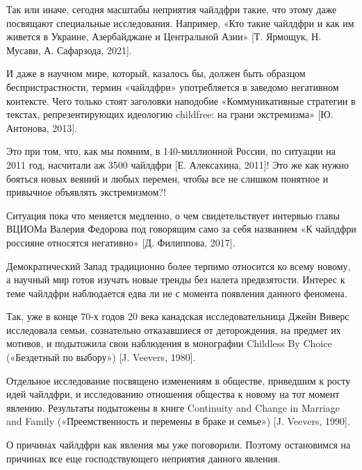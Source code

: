 Так или иначе, сегодня масштабы неприятия чайлдфри такие, что этому даже посвящают специальные исследования. Например, «Кто такие чайлдфри и как им живется в Украине, Азербайджане и Центральной Азии» [Т. Ярмощук, Н. Мусави, А. Сафарзода, 2021].

И даже в научном мире, который, казалось бы, должен быть образцом беспристрастности, термин «чайлдфри» употребляется в заведомо негативном контексте. Чего только стоят заголовки наподобие «Коммуникативные стратегии в текстах, репрезентирующих идеологию childfree: на грани экстремизма» [Ю. Антонова, 2013].

Это при том, что, как мы помним, в 140-миллионной России, по ситуации на 2011 год, насчитали аж 3500 чайлдфри [Е. Алексахина, 2011]! Это же как нужно бояться новых веяний и любых перемен, чтобы все не слишком понятное и привычное объявлять экстремизмом?!

Ситуация пока что меняется медленно, о чем свидетельствует интервью главы ВЦИОМа Валерия Федорова под говорящим само за себя названием «К чайлдфри россияне относятся негативно» [Д. Филиппова, 2017].

Демократический Запад традиционно более терпимо относится ко всему новому, а научный мир готов изучать новые тренды без налета предвзятости. Интерес к теме чайлдфри наблюдается едва ли не с момента появления данного феномена.

Так, уже в конце 70-х годов 20 века канадская исследовательница Джейн Виверс исследовала семьи, сознательно отказавшиеся от деторождения, на предмет их мотивов, и подытожила свои наблюдения в монографии Childless By Choice («Бездетный по выбору») [J. Veevers, 1980].

Отдельное исследование посвящено изменениям в обществе, приведшим к росту идей чайлдфри, и исследованию отношения общества к новому на тот момент явлению. Результаты подытожены в книге Continuity and Change in Marriage and Family («Преемственность и перемены в браке и семье») [J. Veevers, 1990].

О причинах чайлдфри как явления мы уже поговорили. Поэтому остановимся на причинах все еще господствующего неприятия данного явления.

